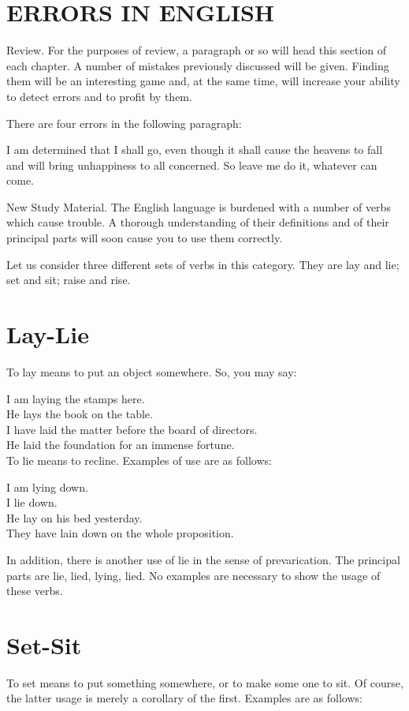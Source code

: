 \documentclass[10pt]{article}
\begin{document}
\section*{ERRORS IN ENGLISH}
Review. For the purposes of review, a paragraph or so will head this section of each chapter. A number of mistakes previously discussed will be given. Finding them will be an interesting game and, at the same time, will increase your ability to detect errors and to profit by them.

There are four errors in the following paragraph:

I am determined that I shall go, even though it shall cause the heavens to fall and will bring unhappiness to all concerned. So leave me do it, whatever can come.

New Study Material. The English language is burdened with a number of verbs which cause trouble. A thorough understanding of their definitions and of their principal parts will soon cause you to use them correctly.

Let us consider three different sets of verbs in this category. They are lay and lie; set and sit; raise and rise.

\section*{Lay-Lie}
To lay means to put an object somewhere. So, you may say:

I am laying the stamps here.\\
He lays the book on the table.\\
I have laid the matter before the board of directors.\\
He laid the foundation for an immense fortune.\\
To lie means to recline. Examples of use are as follows:

I am lying down.\\
I lie down.\\
He lay on his bed yesterday.\\
They have lain down on the whole proposition.

In addition, there is another use of lie in the sense of prevarication. The principal parts are lie, lied, lying, lied. No examples are necessary to show the usage of these verbs.

\section*{Set-Sit}
To set means to put something somewhere, or to make some one to sit. Of course, the latter usage is merely a corollary of the first. Examples are as follows:
\end{document}
